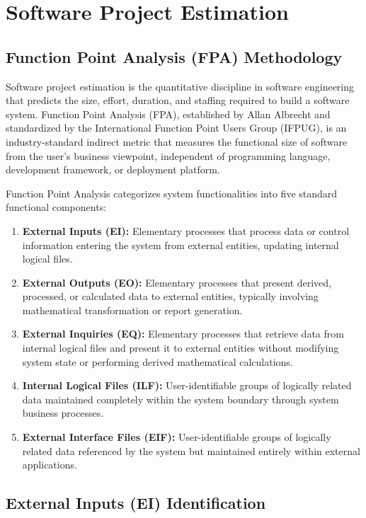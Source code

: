 \chapter{Software Project Estimation}

\section{Function Point Analysis (FPA) Methodology}

Software project estimation is the quantitative discipline in software engineering that predicts the size, effort, duration, and staffing required to build a software system. Function Point Analysis (FPA), established by Allan Albrecht and standardized by the International Function Point Users Group (IFPUG), is an industry-standard indirect metric that measures the functional size of software from the user's business viewpoint, independent of programming language, development framework, or deployment platform.

Function Point Analysis categorizes system functionalities into five standard functional components:

\begin{enumerate}
  \item \textbf{External Inputs (EI):} Elementary processes that process data or control information entering the system from external entities, updating internal logical files.
  \item \textbf{External Outputs (EO):} Elementary processes that present derived, processed, or calculated data to external entities, typically involving mathematical transformation or report generation.
  \item \textbf{External Inquiries (EQ):} Elementary processes that retrieve data from internal logical files and present it to external entities without modifying system state or performing derived mathematical calculations.
  \item \textbf{Internal Logical Files (ILF):} User-identifiable groups of logically related data maintained completely within the system boundary through system business processes.
  \item \textbf{External Interface Files (EIF):} User-identifiable groups of logically related data referenced by the system but maintained entirely within external applications.
\end{enumerate}

\section{External Inputs (EI) Identification}

